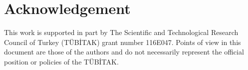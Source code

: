 \documentclass[a4paper,fleqn]{cas-dc}
\begin{document}
\section{ Acknowledgement}

This work is supported in part by The Scientific and Technological Research Council of Turkey (TÜBİTAK) grant number 116E047. Points of view in this document are those of the authors and do not necessarily represent the official position or policies of the TÜBİTAK.




\end{document}
